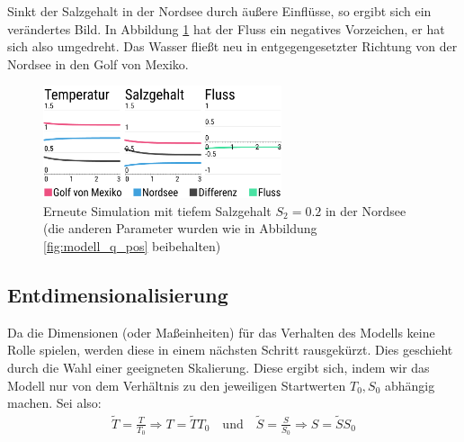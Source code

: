 \documentclass[a4paper,twoside]{article}
\begin{document}
	Sinkt der Salzgehalt in der Nordsee durch äußere Einflüsse, so ergibt sich ein verändertes Bild. In Abbildung \ref{fig:modell_q_neg} hat der Fluss ein negatives Vorzeichen, er hat sich also umgedreht. Das Wasser fließt neu in entgegengesetzter Richtung von der Nordsee in den Golf von Mexiko.
	\begin{figure}[!h]
  		\centering
 		\includegraphics[width=7cm]{../Diagramme/temp-salt-flow_q-neg.png}
  		\caption{Erneute Simulation mit tiefem Salzgehalt \(S_2 = 0.2\) in der Nordsee (die anderen Parameter wurden wie in Abbildung \ref{fig:modell_q_pos} beibehalten)}
  		\label{fig:modell_q_neg}
	\end{figure}
	
	\subsection{Entdimensionalisierung}
	Da die Dimensionen (oder Maßeinheiten) für das Verhalten des Modells keine Rolle spielen, werden diese in einem nächsten Schritt rausgekürzt. Dies geschieht durch die Wahl einer geeigneten Skalierung. Diese ergibt sich, indem wir das Modell nur von dem Verhältnis zu den jeweiligen Startwerten \(T_0, S_0\) abhängig machen. Sei also:
	\begin{align*}
		\tilde{T} = \frac{T}{T_0} \Rightarrow T = \tilde{T} T_0 \quad \textrm{und} \quad \tilde{S} = \frac{S}{S_0} \Rightarrow S = \tilde{S} S_0
	\end{align*}
	
\end{document}
